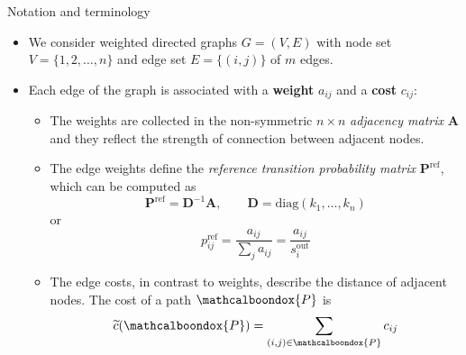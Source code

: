 \documentclass[13pt]{beamer}
\newcommand{\bondox}{\mathcalboondox}
\begin{document}
    \begin{frame}[t,allowframebreaks]{Notation and terminology}

        \begin{itemize}
            \item  We consider weighted directed graphs $G=(V,E)$ with node set $V=\{1,2,\dots,n\}$ and edge set $E=\{(i,j)\}$ of $m$ edges.




            \item Each edge of the graph is associated with a \textbf{weight} $a_{ij}$ and a \textbf{cost} $c_{ij}$:

            \begin{itemize}
                \item The weights are collected in the non-symmetric $n\times n$ \emph{adjacency matrix} $\mathbf{A}$ and they reflect the strength of connection between adjacent nodes.

                \item The edge weights define the \emph{reference transition probability matrix} $\mathbf{P}^{\text{ref}}$, which can be computed as
                \begin{equation*}
                \mathbf{P}^{\text{ref}}=\mathbf{D}^{-1}\mathbf{A},\qquad\mathbf{D}=\text{diag}(k_1,\dots,k_n)
                \end{equation*}
                or
                \begin{equation*}
                p^{\text{ref}}_{ij} = \frac{a_{ij}}{\sum_{j} a_{ij}} = \frac{a_{ij}}{s_i^{\text{out}}}
                \end{equation*}

                \item The edge costs, in contrast to weights, describe the distance of adjacent nodes. The cost of a path $\bondox{P}$ is
                \begin{equation*}
                \widetilde{c}(\bondox{P})=\sum_{(i,j)\in\bondox{P}} c_{ij}
                \end{equation*}
            \end{itemize}


\end{itemize}
\end{frame}
\end{document}
